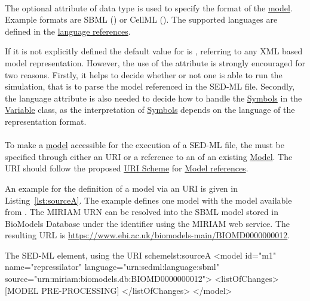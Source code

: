 \paragraph*{}
\label{sec:language}
The optional  attribute of data type \hyperref[type:anyURI]{} is used to specify the format of the \hyperref[class:model]{model}. Example formats are SBML () or CellML (). The supported languages are defined in the \hyperref[sec:languageURI]{language references}.

If it is not explicitly defined the default value for  is , referring to any XML based model representation. However, the use of the  attribute is strongly encouraged for two reasons. Firstly, it helps to decide whether or not one is able to run the simulation, that is to parse the model referenced in the SED-ML file. Secondly, the language attribute is also needed to decide how to handle the \hyperref[sec:implicitVariable]{Symbols} in the \hyperref[class:variable]{Variable} class, as the interpretation of \hyperref[sec:implicitVariable]{Symbols} depends on the language of the representation format.


\paragraph*{}
\label{sec:model_source}
To make a \hyperref[class:model]{model} accessible for the execution of a SED-ML file, the  must be specified through either an URI or a reference to an  of an existing \hyperref[class:model]{Model}. The URI should follow the proposed \hyperref[sec:uriScheme]{URI Scheme} for \hyperref[sec:modelURI]{Model references}.

An example for the definition of a model via an URI is given in Listing~\ref{lst:sourceA}. The example defines one model  with the model  available from . The MIRIAM URN can be resolved into the SBML model stored in BioModels Database under the identifier  using the MIRIAM web service. The resulting URL is \url{https://www.ebi.ac.uk/biomodels-main/BIOMD0000000012}.

\begin{myXmlLst}{The SED-ML  element, using the URI scheme}{lst:sourceA}
<model id="m1" name="repressilator" language="urn:sedml:language:sbml" 
	source="urn:miriam:biomodels.db:BIOMD0000000012">
	<listOfChanges>
		[MODEL PRE-PROCESSING]
	</listOfChanges>
</model>
\end{myXmlLst}

